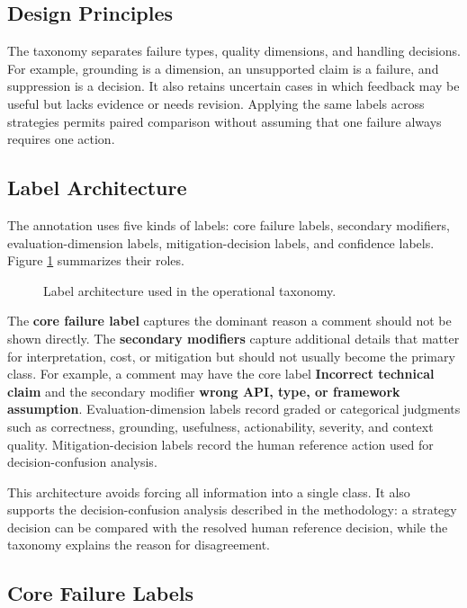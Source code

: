 \documentclass[10pt]{article}
\begin{document}
\subsection{Design Principles}

The taxonomy separates failure types, quality dimensions, and handling decisions. For example, grounding is a dimension, an unsupported claim is a failure, and suppression is a decision. It also retains uncertain cases in which feedback may be useful but lacks evidence or needs revision. Applying the same labels across strategies permits paired comparison without assuming that one failure always requires one action.

\subsection{Label Architecture}

The annotation uses five kinds of labels: core failure labels, secondary modifiers, evaluation-dimension labels, mitigation-decision labels, and confidence labels. Figure \ref{fig:taxonomy-label-architecture} summarizes their roles.

\begin{figure}[H]
\centering

\caption{Label architecture used in the operational taxonomy.}
\label{fig:taxonomy-label-architecture}
\end{figure}

The \textbf{core failure label} captures the dominant reason a comment should not be shown directly. The \textbf{secondary modifiers} capture additional details that matter for interpretation, cost, or mitigation but should not usually become the primary class. For example, a comment may have the core label \textbf{Incorrect technical claim} and the secondary modifier \textbf{wrong API, type, or framework assumption}. Evaluation-dimension labels record graded or categorical judgments such as correctness, grounding, usefulness, actionability, severity, and context quality. Mitigation-decision labels record the human reference action used for decision-confusion analysis.

This architecture avoids forcing all information into a single class. It also supports the decision-confusion analysis described in the methodology: a strategy decision can be compared with the resolved human reference decision, while the taxonomy explains the reason for disagreement.

\subsection{Core Failure Labels}
\end{document}
